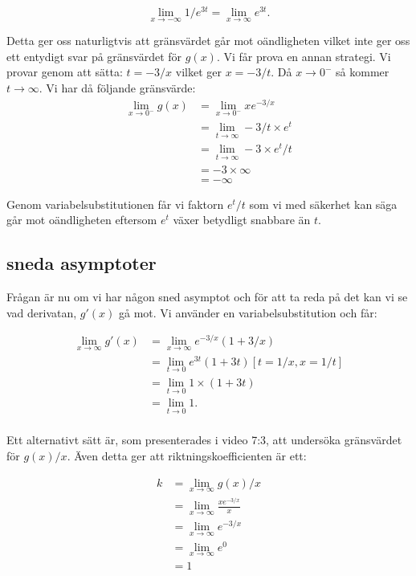 \documentclass[a4paper, 11pt]{article}
\begin{document}
$$\lim\limits_{x \to -\infty} 1/e^{3t} = \lim\limits_{x \to \infty} e^{3t}.$$

Detta ger oss naturligtvis att gränsvärdet går mot oändligheten vilket
inte ger oss ett entydigt svar på gränsvärdet för $g(x)$. Vi får prova
en annan strategi. Vi provar genom att sätta: $t = -3/x$ vilket ger $x
= -3/t$. Då $x \rightarrow 0^-$ så kommer $t \rightarrow \infty$. Vi
har då följande gränsvärde:
\begin{align*}
  \lim\limits_{x \to 0^-} g(x) &= \lim\limits_{x \to 0^-} x e^{-3/x} \\
  &= \lim\limits_{t \to \infty} -3/t \times e^t \\
  &= \lim\limits_{t \to \infty} -3 \times e^t/t \\
  &= -3 \times \infty \\
  &= -\infty
\end{align*}

Genom variabelsubstitutionen får vi faktorn $e^t/t$ som vi med säkerhet
kan säga går mot oändligheten eftersom $e^t$ växer betydligt snabbare
än $t$.

\subsection*{sneda asymptoter}

Frågan är nu om vi har någon sned asymptot och för att ta reda på det
kan vi se vad derivatan, $g'(x)$ gå mot. Vi använder en
variabelsubstitution och får:

\begin{align*}
  \lim\limits_{x \to \infty} g'(x) &= \lim\limits_{x \to \infty} e^{-3/x}(1 + 3/x) \\ 
  &= \lim\limits_{t \to 0} e^{3t}(1 + 3t) [t = 1/x, x = 1/t]\\ 
  &= \lim\limits_{t \to 0} 1 \times (1 + 3t) \\ 
  &= \lim\limits_{t \to 0} 1. \\
\end{align*}

Ett alternativt sätt är, som presenterades i video 7:3, att undersöka
gränsvärdet för $g(x)/x$. Även detta ger att riktningskoefficienten är
ett:

\begin{align*}
  k &= \lim\limits_{x \to \infty} g(x)/x\\
  &= \lim\limits_{x \to \infty} \frac{x e^{-3/x}}{x}\\
  &= \lim\limits_{x \to \infty}  e^{-3/x}\\
  &= \lim\limits_{x \to \infty}  e^{0}\\
  &= 1\\  
\end{align*}
\end{document}
